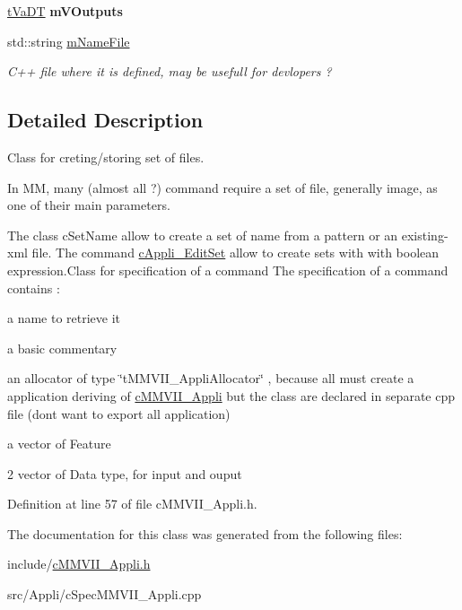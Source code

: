 \begin{DoxyCompactItemize}
\item 
\hyperlink{classMMVII_1_1cSpecMMVII__Appli_a176c2d528029d322f10e428059c85b06}{t\+Va\+DT} {\bfseries m\+V\+Outputs}\hypertarget{classMMVII_1_1cSpecMMVII__Appli_a986316e7d3eeb738fc9fbf4d74294bb8}{}\label{classMMVII_1_1cSpecMMVII__Appli_a986316e7d3eeb738fc9fbf4d74294bb8}

\item 
std\+::string \hyperlink{classMMVII_1_1cSpecMMVII__Appli_a668a3c42dfd6c54ecc80938252bdb915}{m\+Name\+File}\hypertarget{classMMVII_1_1cSpecMMVII__Appli_a668a3c42dfd6c54ecc80938252bdb915}{}\label{classMMVII_1_1cSpecMMVII__Appli_a668a3c42dfd6c54ecc80938252bdb915}

\begin{DoxyCompactList}\small\item\em C++ file where it is defined, may be usefull for devlopers ? \end{DoxyCompactList}\end{DoxyCompactItemize}


\subsection{Detailed Description}
Class for creting/storing set of files. 

In MM, many (almost all ?) command require a set of file, generally image, as one of their main parameters.

The class c\+Set\+Name allow to create a set of name from a pattern or an existing-\/xml file. The command \hyperlink{classMMVII_1_1cAppli__EditSet}{c\+Appli\+\_\+\+Edit\+Set} allow to create sets with with boolean expression.\+Class for specification of a command The specification of a command contains \+:
\begin{DoxyItemize}
\item a name to retrieve it
\item a basic commentary
\item an allocator of type \char`\"{}t\+M\+M\+V\+I\+I\+\_\+\+Appli\+Allocator\char`\"{} , because all must create a application deriving of \hyperlink{classMMVII_1_1cMMVII__Appli}{c\+M\+M\+V\+I\+I\+\_\+\+Appli} but the class are declared in separate cpp file (dont want to export all application)
\end{DoxyItemize}

a vector of Feature
\begin{DoxyItemize}
\item 2 vector of Data type, for input and ouput 
\end{DoxyItemize}

Definition at line 57 of file c\+M\+M\+V\+I\+I\+\_\+\+Appli.\+h.



The documentation for this class was generated from the following files\+:\begin{DoxyCompactItemize}
\item 
include/\hyperlink{cMMVII__Appli_8h}{c\+M\+M\+V\+I\+I\+\_\+\+Appli.\+h}\item 
src/\+Appli/c\+Spec\+M\+M\+V\+I\+I\+\_\+\+Appli.\+cpp\end{DoxyCompactItemize}

